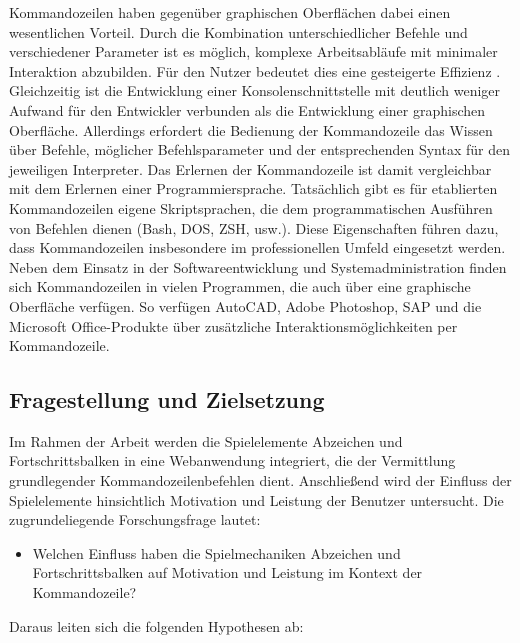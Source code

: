 Kommandozeilen haben gegenüber graphischen Oberflächen dabei einen wesentlichen Vorteil. Durch die Kombination unterschiedlicher Befehle und verschiedener Parameter ist es möglich, komplexe Arbeitsabläufe mit minimaler Interaktion abzubilden. Für den Nutzer bedeutet dies eine gesteigerte Effizienz \cite{Kumar2005}. Gleichzeitig ist die Entwicklung einer Konsolenschnittstelle mit deutlich weniger Aufwand für den Entwickler verbunden als die Entwicklung einer graphischen Oberfläche. Allerdings erfordert die Bedienung der Kommandozeile das Wissen über Befehle, möglicher Befehlsparameter und der entsprechenden Syntax für den jeweiligen Interpreter. Das Erlernen der Kommandozeile ist damit vergleichbar mit dem Erlernen einer Programmiersprache. Tatsächlich gibt es für etablierten Kommandozeilen eigene Skriptsprachen, die dem programmatischen Ausführen von Befehlen dienen (Bash, DOS, ZSH, usw.). Diese Eigenschaften führen dazu, dass Kommandozeilen insbesondere im professionellen Umfeld eingesetzt werden. Neben dem Einsatz in der Softwareentwicklung und Systemadministration finden sich Kommandozeilen in vielen Programmen, die auch über eine graphische Oberfläche verfügen. So verfügen AutoCAD, Adobe Photoshop, SAP und die Microsoft Office-Produkte über zusätzliche Interaktionsmöglichkeiten per Kommandozeile.




\subsection{Fragestellung und Zielsetzung}

Im Rahmen der Arbeit werden die Spielelemente Abzeichen und Fortschrittsbalken in eine Webanwendung integriert, die der Vermittlung grundlegender Kommandozeilenbefehlen dient.
Anschließend wird der Einfluss der Spielelemente hinsichtlich Motivation und Leistung der Benutzer untersucht.
Die zugrundeliegende Forschungsfrage lautet:

\begin{itemize}
    \item Welchen Einfluss haben die Spielmechaniken Abzeichen und Fortschrittsbalken auf Motivation und Leistung im Kontext der Kommandozeile?
\end{itemize}

Daraus leiten sich die folgenden Hypothesen ab:

